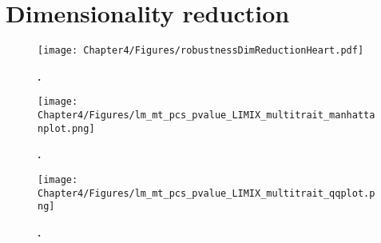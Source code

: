 \section{Dimensionality reduction}
\begin{figure}[hbtp]
	\centering
	\texttt{[image: Chapter4/Figures/robustnessDimReductionHeart.pdf]}
	\caption[\textbf{.}]{\textbf{.} } 
	 	\label{fig:dimRed-heart}
\end{figure}

\begin{figure}[hbtp]
	\centering
	\texttt{[image: Chapter4/Figures/lm\_mt\_pcs\_pvalue\_LIMIX\_multitrait\_manhattanplot.png]}
	\caption[\textbf{.}]{\textbf{.} } 
	 	\label{fig:dimRed-heart}
\end{figure}

\begin{figure}[hbtp]
	\centering
	\texttt{[image: Chapter4/Figures/lm\_mt\_pcs\_pvalue\_LIMIX\_multitrait\_qqplot.png]}
	\caption[\textbf{.}]{\textbf{.} } 
	 	\label{fig:dimRed-heart}
\end{figure}